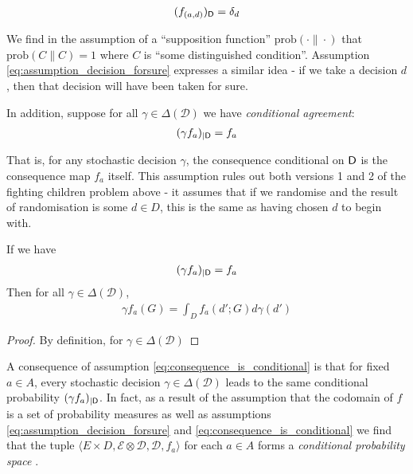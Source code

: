 \begin{align}
	(f_{(a,d)})_{\mathsf{D}} = \delta_d \label{eq:assumption_decision_forsure}
\end{align}

We find in \cite{joyce_why_2000} the assumption of a ``supposition function'' $\mathrm{prob}(\cdot\|\cdot)$ that $\mathrm{prob}(C\|C)=1$ where $C$ is ``some distinguished condition''. Assumption \ref{eq:assumption_decision_forsure} expresses a similar idea - if we take a decision $d$, then that decision will have been taken for sure.

In addition, suppose for all $\gamma\in \Delta(\mathcal{D})$ we have \emph{conditional agreement}:
\begin{align}
	(\gamma f_{a})_{|\mathsf{D}} = f_a \label{eq:consequence_is_conditional}
\end{align}

That is, for any stochastic decision $\gamma$, the consequence conditional on $\mathsf{D}$ is the consequence map $f_a$ itself. This assumption rules out both versions 1 and 2 of the fighting children problem above - it assumes that if we randomise and the result of randomisation is some $d\in D$, this is the same as having chosen $d$ to begin with.

\begin{lemma}
If we have 
\begin{align}
(\gamma f_{a})_{|\mathsf{D}} = f_a
\end{align}
Then for all $\gamma\in \Delta(\mathcal{D})$,
\begin{align}
\gamma f_a (G) = \int_D f_a(d';G) d\gamma(d')
\end{align}
\end{lemma}

\begin{proof}
By definition, for $\gamma\in \Delta(\mathcal{D})$
\end{proof}

A consequence of assumption \ref{eq:consequence_is_conditional} is that for fixed $a\in A$, every stochastic decision $\gamma\in \Delta(\mathcal{D})$ leads to the same conditional probability $(\gamma f_{a})_{|\mathsf{D}}$. In fact, as a result of the assumption that the codomain of $f$ is a set of probability measures as well as assumptions \ref{eq:assumption_decision_forsure} and \ref{eq:consequence_is_conditional} we find that the tuple $\langle E\times D, \mathcal{E}\otimes\mathcal{D}, \mathcal{D}, f_a\rangle$ for each $a\in A$ forms a \emph{conditional probability space} \citep{renyi_new_1955}.



